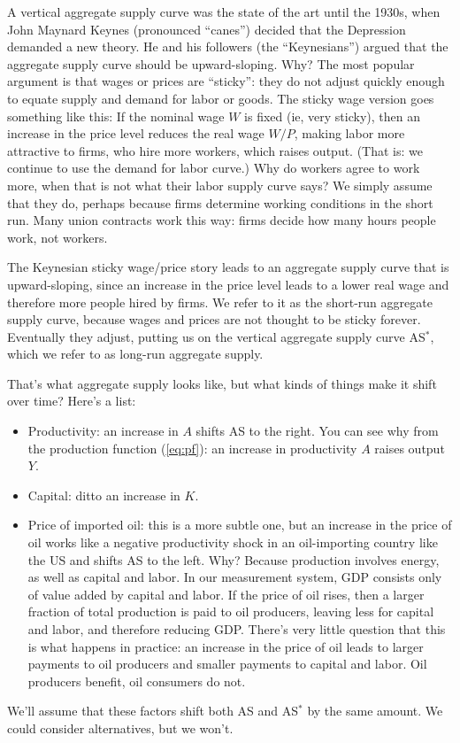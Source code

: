 \documentclass[letterpaper,12pt]{article}
\begin{document}
A vertical aggregate supply curve was the state of the art until the 1930s,
when John Maynard Keynes (pronounced ``canes'')
decided that the Depression demanded a new theory.
He and his followers (the ``Keynesians'')
argued that the aggregate supply curve should be upward-sloping.
Why?  The most popular argument is that wages or prices are ``sticky'':
they do not adjust quickly enough
to equate supply and demand for labor or goods.
The sticky wage version goes something like this:
If the nominal wage $W$ is fixed (ie, very sticky),
then an increase in the price level reduces the real wage $W/P$,
making labor more attractive to firms, who hire more workers,
which raises output.
(That is:  we continue to use the demand for labor curve.)
Why do workers agree to work more,
when that is not what their labor supply curve says?
We simply assume that they do, perhaps because firms determine
working conditions in the short run.
Many union contracts work this way:  firms decide how many hours
people work, not workers.

The Keynesian sticky wage/price story leads to
an aggregate supply curve that is upward-sloping,
since an increase in the price level leads to a lower
real wage and therefore more people hired by firms.
We refer to it as the short-run aggregate supply curve,
because wages and prices are not thought to be sticky forever.
Eventually they adjust, putting us on the vertical aggregate
supply curve AS$^*$,
which we refer to as long-run aggregate supply.


That's what aggregate supply looks like,
but what kinds of things make it shift over time?
Here's a list:
%
\begin{itemize}
\item Productivity:  an increase in $A$ shifts AS to the right.
You can see why from the production function (\ref{eq:pf}): 
an increase in productivity $A$ raises output $Y$.  


\item Capital:  ditto an increase in $K$.
\item Price of imported oil:  this is a more subtle one, but
an increase in the price of oil works like a negative productivity shock
in an oil-importing country like the US and shifts AS to the left.
Why?  Because production involves energy, as well as capital and labor.
In our measurement system, GDP consists only of value added by capital
and labor.
If the price of oil rises, then a larger fraction of total production
is paid to oil producers, leaving less for capital and labor,
and therefore reducing GDP.
There's very little question that this is what happens in practice:
an increase in the price of oil leads to larger payments to oil producers
and smaller payments to capital and labor.
Oil producers benefit, oil consumers do not.
\end{itemize}
%
We'll assume that these factors shift both AS and AS$^*$
by the same amount.
We could consider alternatives, but we won't.
\end{document}
